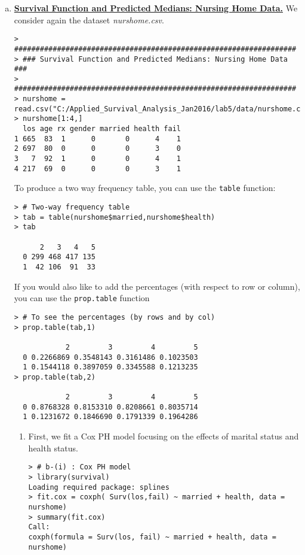 \begin{enumerate}[(a)]
\begin{enumerate}[(i)]
\begin{spacing}{1.2}
\begin{footnotesize}
\begin{verbatim}
  Res.Df Df  Chisq Pr(>Chisq)   
1   1148                        
2   1147  1 8.7608   0.003078 **
---
Signif. codes:  0 ‘***’ 0.001 ‘**’ 0.01 ‘*’ 0.05 ‘.’ 0.1 ‘ ’ 1
\end{verbatim}
\end{footnotesize}
\end{spacing}
\end{enumerate}
\item \textbf{\underline{Survival Function and Predicted Medians: Nursing Home Data.}} We consider again the dataset \emph{nurshome.csv}.
\begin{footnotesize}
\begin{verbatim}
> ##################################################################
> ### Survival Function and Predicted Medians: Nursing Home Data ###
> ##################################################################
> nurshome = read.csv("C:/Applied_Survival_Analysis_Jan2016/lab5/data/nurshome.csv")
> nurshome[1:4,]
  los age rx gender married health fail
1 665  83  1      0       0      4    1
2 697  80  0      0       0      3    0
3   7  92  1      0       0      4    1
4 217  69  0      0       0      3    1
\end{verbatim}
\end{footnotesize}
To produce a two way frequency table, you can use the \verb|table| function:
\begin{footnotesize}
\begin{verbatim}
> # Two-way frequency table
> tab = table(nurshome$married,nurshome$health)
> tab
   
      2   3   4   5
  0 299 468 417 135
  1  42 106  91  33
\end{verbatim}
\end{footnotesize}
If you would also like to add the percentages (with respect to row or column), you can use the \verb|prop.table| function
\begin{footnotesize}
\begin{verbatim}
> # To see the percentages (by rows and by col)
> prop.table(tab,1)
   
            2         3         4         5
  0 0.2266869 0.3548143 0.3161486 0.1023503
  1 0.1544118 0.3897059 0.3345588 0.1213235
> prop.table(tab,2)
   
            2         3         4         5
  0 0.8768328 0.8153310 0.8208661 0.8035714
  1 0.1231672 0.1846690 0.1791339 0.1964286
\end{verbatim}
\end{footnotesize}
\begin{enumerate}
\item First, we fit a Cox PH model focusing on the effects of marital status and health status.
\begin{footnotesize}
\begin{verbatim}
> # b-(i) : Cox PH model
> library(survival)
Loading required package: splines
> fit.cox = coxph( Surv(los,fail) ~ married + health, data = nurshome)
> summary(fit.cox)
Call:
coxph(formula = Surv(los, fail) ~ married + health, data = nurshome)


\end{verbatim}
\end{footnotesize}
\end{enumerate}
\end{enumerate}

